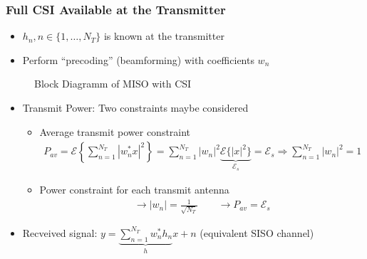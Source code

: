 \documentclass[a4paper, 10pt]{article}
\begin{document}
\subsubsection{Full CSI Available at the Transmitter}
\begin{itemize}
	\item $h_n, n \in \{1,\dots,N_T\}$ is known at the transmitter
	\item Perform ``precoding'' (beamforming) with coefficients $w_n$
\end{itemize}
\begin{figure}[ht]
		
	\caption{Block Diagramm of MISO with CSI}
	\label{fig:MISO_CSI.pstex_t}
\end{figure}

\begin{itemize}
	\item Transmit Power: Two constraints maybe considered
	\begin{itemize}
		\item Average transmit power constraint
		\begin{align*}
		P_{av}=\mathcal{E}\left\{\sum\limits^{N_T}_{n=1}|w_n^*x|^2\right\}=\sum\limits_{n=1}^{N_T}|w_n|^2\underbrace{\mathcal{E}\{|x|^2\}}_{\mathcal{E}_s}=\mathcal{E}_s \Rightarrow \sum\limits^{N_T}_{n=1}|w_n|^2=1
		\end{align*}
		\item Power constraint for each transmit antenna
		\begin{align*}
		\rightarrow |w_n|=\frac{1}{\sqrt{N_T}} \qquad \rightarrow P_{av}=\mathcal{E}_s
		\end{align*}
	\end{itemize}
	\item Recveived signal: $y=\underbrace{\sum\limits^{N_T}_{n=1}w^*_nh_n}_{h}x+n$ (equivalent SISO channel)
\end{itemize}
\end{document}
